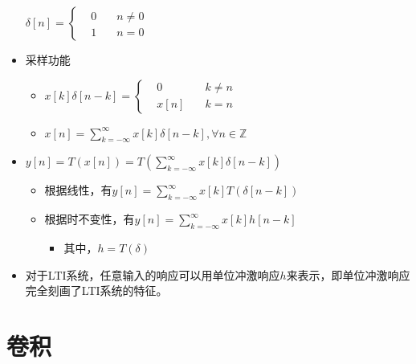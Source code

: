 \documentclass[CJKutf8,dvipsnames,table]{beamer}
\begin{document}
\begin{CJK*}{UTF8}{song}
\begin{frame}
\begin{itemize}
    \begin{math}
\delta[n] = 
\left\{
    \begin {aligned}
         & 0 \quad & n \neq 0 \\
         & 1 \quad & n = 0                  
    \end{aligned}
\right.
	\end{math}    
 
    \item 采样功能
        \begin{itemize}
        \item 
    \begin{math}
x[k]\delta[n-k] = 
\left\{
    \begin {aligned}
         & 0 \quad & k \neq n \\
         & x[n] \quad & k = n                  
    \end{aligned}
\right.
	\end{math}     
        \item $x[n]=\sum_{k=-\infty}^{\infty}x[k]\delta[n-k], \forall n \in \mathbb{Z}$
        \end{itemize} 
        
    \item $y[n]=T(x[n])=T(\sum_{k=-\infty}^{\infty}x[k]\delta[n-k])$
        \begin{itemize}
        \item 根据线性，有$y[n]=\sum_{k=-\infty}^{\infty}x[k]T(\delta[n-k])$
        \item 根据时不变性，有$y[n]=\sum_{k=-\infty}^{\infty}x[k]h[n-k]$
            \begin{itemize}
            \item 其中，$h=T(\delta)$
            \end{itemize}
        \end{itemize}
    \item 对于LTI系统，任意输入的响应可以用单位冲激响应$h$来表示，即单位冲激响应完全刻画了LTI系统的特征。
    \end{itemize} 
  \end{frame}    
    

  \section{卷积}
      

\end{CJK*}
\end{document}

